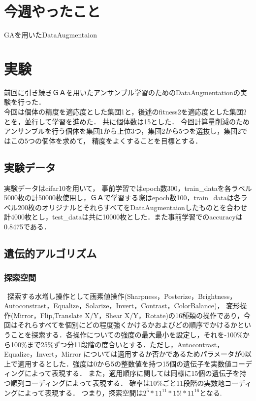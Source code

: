 \documentclass[twocolumn]{jarticle}     %
\begin{document}


\section{今週やったこと}
 GAを用いたDataAugmentaion

\section{実験}
前回に引き続きＧＡを用いたアンサンブル学習のためのDataAugmentationの実験を行った．\\
今回は個体の精度を適応度とした集団1と，後述のfitness2を適応度とした集団2とを，並行して学習を進めた．
共に個体数は15とした．
今回計算量削減のためアンサンブルを行う個体を集団1から上位3つ，集団2から5つを選抜し，集団2ではこの5つの個体を求めて，
精度をよくすることを目標とする．

\subsection{実験データ}
実験データはcifar10を用いて，
事前学習ではepoch数300，train\_dataを各ラベル5000枚の計50000枚使用し，ＧＡで学習する際はepoch数100，train\_dataは各ラベル200枚のオリジナルとそれらすべてをDataAugmentaionしたものとを合わせ計4000枚とし，test\_dataは共に10000枚とした．また事前学習でのaccuracyは0.8475である．
\subsection{遺伝的アルゴリズム}


\subsubsection{探索空間}
\ 探索する水増し操作として画素値操作(Sharpness，Posterize，Brightness，Autoconstrast，Equalize，Solarize，Invert，Contrast，ColorBalance)，
変形操作(Mirror，Flip,Translate X/Y，Shear X/Y，Rotate)の16種類の操作であり，今回はそれらすべてを個別にどの程度強くかけるかおよびどの順序でかけるかということを探索する．各操作についての強度の最大最小を設定し，それを-100\%から100\%まで25\%ずつ分11段階の度合いとする．ただし，Autocontrast，Equalize，Invert，Mirror については適用するか否かであるためパラメータが0以上で適用するとした．強度は0から5の整数値を持つ15個の遺伝子を実数値コーディングによって表現する．
また，適用順序に関しては同様に15個の遺伝子を持つ順列コーディングによって表現する．
確率は10\%ごと11段階の実数地コーディングによって表現する．
つまり，探索空間は$2^5*11^{11}*15!*11^{16}$となる.
\end{document}
